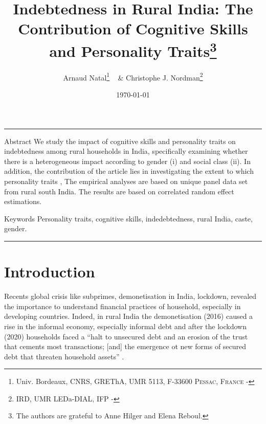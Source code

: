 \documentclass[a4paper, 11pt, onecolumn]{article}
\title{{Indebtedness in Rural India: The Contribution of Cognitive Skills and Personality Traits\thanks{The authors are grateful to Anne Hilger and Elena Reboul.}}}
\author{Arnaud Natal\thanks{Univ. Bordeaux, CNRS, GREThA, UMR 5113, F-33600 \textsc{Pessac, France} - \email{arnaud.natal@u-bordeaux.fr}} ~ \& Christophe J. Nordman\thanks{IRD, UMR LEDa-DIAL, IFP - \email{nordman@dial.prd}} }
\date{\today}
\begin{document}
\maketitle

\hrule 
\vspace{0.3cm}

\begin{resab}{Abstract}
We study the impact of cognitive skills and personality traits on indebtedness among rural households in India, specifically examining whether there is a heterogeneous impact according to gender (i) and social class (ii).
In addition, the contribution of the article lies in investigating the extent to which personality traits , 
The empirical analyses are based on unique panel data set from rural south India. 
The results are based on correlated random effect estimations. 
\end{resab}

\begin{motkey}{Keywords}
Personality traits, cognitive skills, indedebtedness, rural India, caste, gender.
\end{motkey}


\hrule

\section*{Introduction}
\label{Introduction}

Recents global crisis like subprimes, demonetisation in India, lockdown, revealed the importance to understand financial practices of household, especially in developing countries.
Indeed, in rural India the demonetisation (2016) caused a rise in the informal economy, especially informal debt \citep{GuerinDemo2017} and after the lockdown (2020) households faced a ``halt to unsecured debt and an erosion of the trust that cements most transactions; [and] the emergence ot new forms of secured debt that threaten household assets'' \citep{Guerin2020}.


\end{document}
